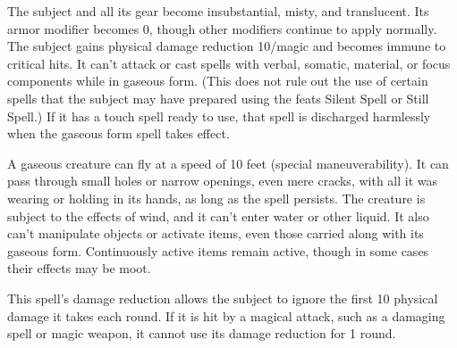 \begin{comment}
\subsubsection{G}
\end{comment}

\spellrng{\rngtouch}
\begin{spelleffect}
  The subject and all its gear become insubstantial, misty, and translucent. Its armor modifier becomes 0, though other modifiers continue to apply normally. The subject gains physical damage reduction 10/magic and becomes immune to critical hits. It can't attack or cast spells with verbal, somatic, material, or focus components while in gaseous form. (This does not rule out the use of certain spells that the subject may have prepared using the feats Silent Spell or Still Spell.) If it has a touch spell ready to use, that spell is discharged harmlessly when the gaseous form spell takes effect.
  \par A gaseous creature can fly at a speed of 10 feet (special maneuverability). It can pass through small holes or narrow openings, even mere cracks, with all it was wearing or holding in its hands, as long as the spell persists. The creature is subject to the effects of wind, and it can't enter water or other liquid. It also can't manipulate objects or activate items, even those carried along with its gaseous form. Continuously active items remain active, though in some cases their effects may be moot.
\end{spelleffect}
\begin{spellnotes}
  This spell's damage reduction allows the subject to ignore the first 10 physical damage it takes each round. If it is hit by a magical attack, such as a damaging spell or magic weapon, it cannot use its damage reduction for 1 round.
\end{spellnotes}

